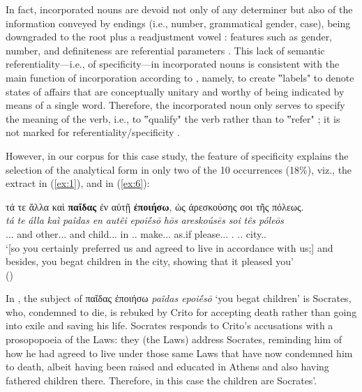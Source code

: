 \documentclass[output=paper,colorlinks,citecolor=brown]{langscibook}
\begin{document}
In fact, incorporated nouns are devoid not only of any determiner but also of the information conveyed by endings (i.e., number, grammatical gender, case), being downgraded to the root plus a readjustment vowel \citep{Pompei2006}: features such as gender, number, and definiteness are referential parameters \citep{vonHeusinger2003}. This lack of semantic referentiality---i.e., of specificity---in incorporated nouns is consistent with the main function of incorporation according to \citet{Mithun1984}, namely, to create ‟labels" to denote states of affairs that are conceptually unitary and worthy of being indicated by means of a single word. Therefore, the incorporated noun only serves to specify the meaning of the verb, i.e., to ‟qualify" the verb rather than to ‟refer" \citep[866]{Mithun1984}; it is not marked for referentiality/specificity \citep[859]{Mithun1984}.

However, in our corpus for this case study, the feature of specificity explains the selection of the analytical form in only two of the 10 occurrences (18\%), viz., the extract in (\ref{ex:1}), and in (\ref{ex:6}):

\ea \label{ex:6}
\glll [\ldots{}] τά 		τε 	ἄλλα 		καὶ 	\textbf{παῖδας}      	ἐν 	αὐτῇ \textbf{ἐποιήσω},		ὡς 	ἀρεσκούσης 		σοι 		τῆς 		πόλεως.\\
{} \textit{tá}		\textit{te} 	\textit{álla} 		\textit{kaì}	\textit{paîdas}	      	\textit{en}	\textit{autêi} \textit{epoiḗsō}		\textit{hōs}	\textit{areskoúsēs}		\textit{soi}		\textit{tês} 		\textit{póleōs}\\
{} \Art{}.\Acc{}.\N{}.\Pl{} and other.\Acc{}.\N{}.\Pl{} and child.\Acc{}.\M{}.\Pl{} in \Dem{}.\Dat{}.\F{} make.\Aor{}.\Mid{}.\Ssg{} as.if please.\Ptcp{}.\Gen{}.\F{} \Ssg{}.\Dat{} \Art{}.\Gen{}.\F{} city.\Gen{}.\F{}\\
\glt `[so you certainly preferred us and agreed to live in accordance with us;] and besides, you begat children in the city, showing that it pleased you' \\
\hspace*{\fill}()
\z

In , the subject of παῖδας ἐποιήσω \textit{paîdas epoiḗsō} `you begat children' is Socrates, who, condemned to die, is rebuked by Crito for accepting death rather than going into exile and saving his life. Socrates responds to Crito’s accusations with a prosopopoeia of the Laws: they (the Laws) address Socrates, reminding him of how he had agreed to live under those same Laws that have now condemned him to death, albeit having been raised and educated in Athens and also having fathered children there. Therefore, in this case the children are Socrates'. 
\end{document}
